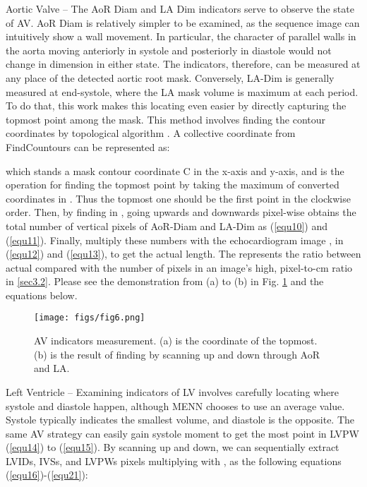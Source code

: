 \documentclass{article}
\begin{document}
Aortic Valve – The AoR Diam and LA Dim indicators serve to observe the state of AV. AoR Diam is relatively simpler to be examined, as the sequence image can intuitively show a wall movement. In particular, the character of parallel walls in the aorta moving anteriorly in systole and posteriorly in diastole would not change in dimension in either state. The indicators, therefore, can be measured at any place of the detected aortic root mask. Conversely, LA-Dim is generally measured at end-systole, where the LA mask volume is maximum at each period. To do that, this work makes this locating even easier by directly capturing the topmost point among the mask. This method involves finding the contour coordinates by topological algorithm \cite{suzuki1985topological}. A collective coordinate from FindCountours can be represented as: 
\useshortskip

\useshortskip

which  stands a mask contour coordinate C in the x-axis and y-axis, and  is the operation for finding the topmost point by taking the maximum of converted coordinates in . Thus the topmost one should be the first point in the clockwise order. Then, by finding  in , going upwards and downwards pixel-wise obtains the total number of vertical pixels of AoR-Diam and LA-Dim as (\ref{equ10}) and (\ref{equ11}). Finally, multiply these numbers with the echocardiogram image , in (\ref{equ12}) and (\ref{equ13}), to get the actual length. The  represents the ratio between actual  compared with the number of pixels in an image's high, pixel-to-cm ratio in \ref{sec3.2}. Please see the demonstration from (a) to (b) in Fig. \ref{fig6} and the equations below. 
\useshortskip

\useshortskip

\useshortskip

\useshortskip

\begin{figure}[!t]
    \centering
    \texttt{[image: figs/fig6.png]}
    \caption{AV indicators measurement. (a) is the coordinate of the topmost. (b) is the result of finding by scanning up and down through AoR and LA.}
    \label{fig6}
\end{figure}

Left Ventricle – Examining indicators of LV involves carefully locating where systole and diastole happen, although MENN chooses to use an average value. Systole typically indicates the smallest volume, and diastole is the opposite. The same AV strategy can easily gain systole moment to get the most point in LVPW (\ref{equ14}) to (\ref{equ15}). By scanning up and down, we can sequentially extract LVIDs, IVSs, and LVPWs pixels multiplying with , as the following equations (\ref{equ16})-(\ref{equ21}):
\useshortskip
\end{document}
